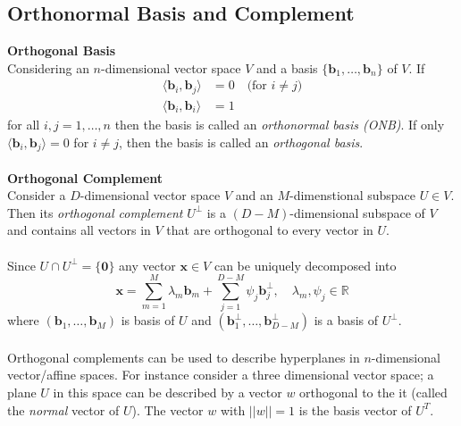 \documentclass{report}
\begin{document}
\subsection{Orthonormal Basis and Complement} %
\textbf{Orthogonal Basis}\\
Considering an $n$-dimensional vector space $V$ and a basis $\{\bm{b}_1,\ldots,\bm{b}_n\}$ of $V$. If
\begin{align*}
\langle\bm{b}_i,\bm{b}_j\rangle&=0\quad\text{(for $i\neq j$)}\\
\langle\bm{b}_i,\bm{b}_i\rangle&=1
\end{align*}
for all $i,j=1,\ldots,n$ then the basis is called an \textit{orthonormal basis (ONB)}. If only 
$\langle\bm{b}_i,\bm{b}_j\rangle=0$ for $i\neq j$, then the basis is called an \textit{orthogonal basis}.\\
\vspace{1mm}\\
\textbf{Orthogonal Complement}\\
Consider a $D$-dimensional vector space $V$ and an $M$-dimenstional subspace $U\in V$. Then its 
\textit{orthogonal complement} $U^\perp$ is a $(D-M)$-dimensional subspace of $V$ and contains all vectors in
$V$ that are orthogonal to every vector in $U$.\\
\vspace{1mm}\\
Since $U\cap U^\perp=\{\bm{0}\}$ any vector $\bm{x}\in V$ can be uniquely decomposed into
\begin{equation*}
\bm{x}=\sum^M_{m=1}\lambda_m\bm{b}_m+\sum^{D-M}_{j=1}\psi_j\bm{b}^\perp_j,\quad
\lambda_m,\psi_j\in\mathbb{R}
\end{equation*}
where $(\bm{b}_1,\ldots,\bm{b}_M)$ is basis of $U$ and 
$(\bm{b}^\perp_1,\ldots,\bm{b}^\perp_{D-M})$
is a basis of $U^\perp$.\\
\vspace{1mm}\\
Orthogonal complements can be used to describe hyperplanes in $n$-dimensional vector/affine spaces.
For instance consider a three dimensional vector space; a plane $U$ in this space can be described 
by a vector $w$ orthogonal to the it (called the \textit{normal} vector of $U$). The vector $w$ with $||w||=1$
is the basis vector of $U^T$.
\newpage
\end{document}

